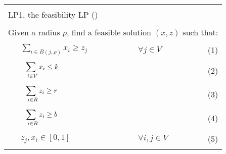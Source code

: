 \renewcommand{\arraystretch}{0.7}
\begin{tabularx}{\linewidth}{|lllr|}
    \hline
    & & &\tabularnewline
    \multicolumn{4}{|X|}{LP1, the feasibility LP (\cite{bandyapadhyay_constant_2019})} \tabularnewline
    \hline
    & & &\tabularnewline
    \multicolumn{4}{|X|}{Given a radius $\rho$, find a feasible solution $(x,z)$ such that:} \tabularnewline
    & & &\tabularnewline
    \hphantom{.....}& $\displaystyle \sum_{i\in B(j,\rho)} x_i\geq z_j$ & $\forall j\in V$&(1)\tabularnewline
    & & &\tabularnewline
    \hphantom{.....}& $\displaystyle \hphantom{.}\sum_{\hphantom{..}i\in V} x_i\leq k\hphantom{..}$ & &(2)\tabularnewline
    & & &\tabularnewline
    \hphantom{.....}& $\displaystyle \hphantom{.}\sum_{\hphantom{..}i\in R} z_i\geq r\hphantom{..}$ & &(3)\tabularnewline
    & & &\tabularnewline
    \hphantom{.....}& $\displaystyle \hphantom{.}\sum_{\hphantom{..}i\in B} z_i\geq b\hphantom{..}$ & &(4)\tabularnewline
    & & &\tabularnewline
    \hphantom{.....}& $z_j,x_i\in [0,1]$ & $\forall i,j\in V$ &(5)\tabularnewline
    & & &\tabularnewline
    \hline
\end{tabularx}%
\renewcommand{\arraystretch}{1}
